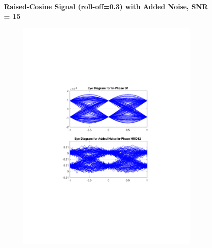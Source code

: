 \begin{figure}[H]
		\centering
	\textbf{Raised-Cosine Signal (roll-off=0.3) with Added Noise, SNR = 15}
	\begin{minipage}{\linewidth}
		\centering
	\begin{subfigure}{.45\textwidth}
		\centering
		\includegraphics[clip, trim=5cm 7cm 5cm 7cm, width=\textwidth]{./sdf/m_qam_system/figures/eyes/if_n_nmf_45_60_rc.pdf}
	\end{subfigure}
	\begin{subfigure}{.45\textwidth}
		\centering

\end{subfigure}
\end{minipage}
\end{figure}
